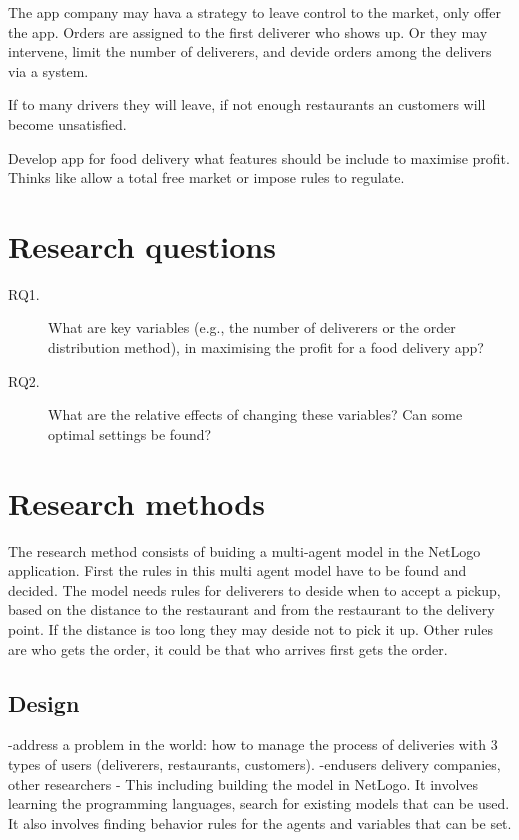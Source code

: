 The app company may hava a strategy to leave control to the market, only offer the app.
Orders are assigned to the first deliverer who shows up.
Or they may intervene, limit the number of deliverers, and devide orders among the delivers via a system.







If to many drivers they will leave, if not enough restaurants an customers will become unsatisfied.



Develop app for food delivery what features should be include to maximise profit.
Thinks like allow a total free market or impose rules to regulate.



\section{Research questions}

\begin{description}
    \item[RQ1.] What are key variables (e.g., the number of deliverers or the order distribution method), in maximising the profit for a food delivery app?
    \item[RQ2.] What are the relative effects of changing these variables? Can some optimal settings be found?
\end{description}

\section{Research methods}
The research method consists of buiding a multi-agent model in the NetLogo application.
First the rules in this multi agent model have to be found and decided.
The model needs rules for deliverers to deside when to accept a pickup, based on the distance to the restaurant and from the restaurant to the delivery point.
If the distance is too long they may deside not to pick it up.
Other rules are who gets the order, it could be that who arrives first gets the order.

\subsection{Design}
-address a problem in the world: how to manage the process of deliveries with 3 types of users (deliverers, restaurants, customers).
-endusers delivery companies, other researchers
-
This including building the model in NetLogo.
It involves learning the programming languages, search for existing models that can be used.
It also involves finding behavior rules for the agents and variables that can be set.

